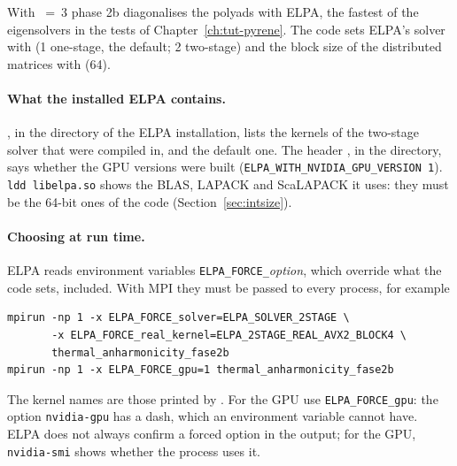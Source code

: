 With ~=~3 phase 2b diagonalises the polyads with ELPA, the
fastest of the eigensolvers in the tests of Chapter~\ref{ch:tut-pyrene}.
The code sets ELPA's solver with  (1 one-stage, the
default; 2 two-stage) and the block size of the distributed matrices with
 (64).

\paragraph{What the installed ELPA contains.} ,
in the  directory of the ELPA installation, lists the kernels of
the two-stage solver that were compiled in, and the default one. The
header , in the 
directory, says whether the GPU versions were built
(\texttt{ELPA\_WITH\_NVIDIA\_GPU\_VERSION 1}). \texttt{ldd libelpa.so}
shows the BLAS, LAPACK and ScaLAPACK it uses: they must be the 64-bit ones
of the code (Section~\ref{sec:intsize}).

\paragraph{Choosing at run time.} ELPA reads environment variables
\texttt{ELPA\_FORCE\_}\emph{option}, which override what the code sets,
 included. With MPI they must be passed to every process,
for example
\begin{verbatim}
mpirun -np 1 -x ELPA_FORCE_solver=ELPA_SOLVER_2STAGE \
       -x ELPA_FORCE_real_kernel=ELPA_2STAGE_REAL_AVX2_BLOCK4 \
       thermal_anharmonicity_fase2b
mpirun -np 1 -x ELPA_FORCE_gpu=1 thermal_anharmonicity_fase2b
\end{verbatim}
The kernel names are those printed by . For
the GPU use \texttt{ELPA\_FORCE\_gpu}: the option \texttt{nvidia-gpu} has a
dash, which an environment variable cannot have. ELPA does not always
confirm a forced option in the output; for the GPU, \texttt{nvidia-smi}
shows whether the process uses it.

